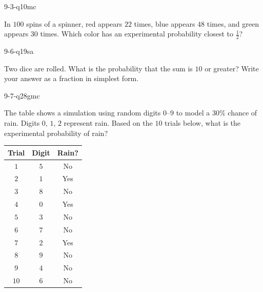 \begin{practiceQuestion}{9-3-q10}{mc}
\begin{questionText}
In $100$ spins of a spinner, red appears $22$ times, blue appears $48$ times, and green appears $30$ times. Which color has an experimental probability closest to $\frac{1}{2}$?
\end{questionText}
\end{practiceQuestion}

\begin{practiceQuestion}{9-6-q19}{sa}
\begin{questionText}
Two dice are rolled. What is the probability that the sum is $10$ or greater? Write your answer as a fraction in simplest form.
\end{questionText}
\end{practiceQuestion}

\begin{practiceQuestion}{9-7-q28}{gmc}
\begin{questionText}
The table shows a simulation using random digits $0$--$9$ to model a $30\%$ chance of rain. Digits $0$, $1$, $2$ represent rain. Based on the $10$ trials below, what is the experimental probability of rain?

\begin{center}
\begin{tabular}{|c|c|c|}
\hline
\textbf{Trial} & \textbf{Digit} & \textbf{Rain?} \\
\hline
$1$ & $5$ & No \\
\hline
$2$ & $1$ & Yes \\
\hline
$3$ & $8$ & No \\
\hline
$4$ & $0$ & Yes \\
\hline
$5$ & $3$ & No \\
\hline
$6$ & $7$ & No \\
\hline
$7$ & $2$ & Yes \\
\hline
$8$ & $9$ & No \\
\hline
$9$ & $4$ & No \\
\hline
$10$ & $6$ & No \\
\hline
\end{tabular}
\end{center}
\end{questionText}
\end{practiceQuestion}
